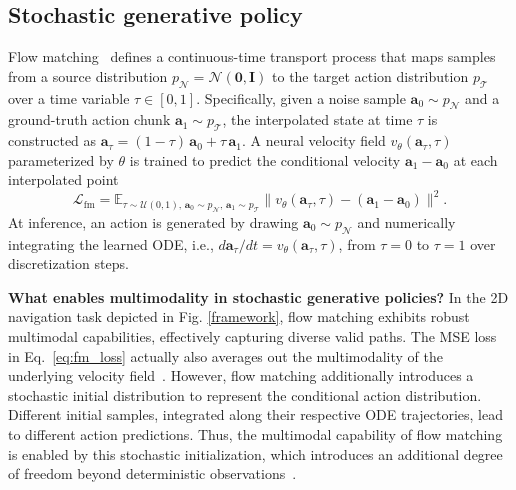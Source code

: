 \subsection{Stochastic generative policy}

Flow matching~\citep{flowmatching} defines a continuous-time transport process that maps samples from a source distribution $p_\mathcal{N} = \mathcal{N}(\mathbf{0}, \mathbf{I})$ to the target action distribution $p_\mathcal{T}$ over a time variable $\tau \in [0,1]$. Specifically, given a noise sample $\mathbf{a}_0 \sim p_\mathcal{N}$ and a ground-truth action chunk $\mathbf{a}_1 \sim p_\mathcal{T}$, the interpolated state at time $\tau$ is constructed as $\mathbf{a}_\tau = (1\!-\!\tau)\,\mathbf{a}_0 + \tau\,\mathbf{a}_1$. A neural velocity field $v_\theta(\mathbf{a}_\tau, \tau)$ parameterized by $\theta$ is trained to predict the conditional velocity $\mathbf{a}_1 - \mathbf{a}_0$ at each interpolated point
\begin{equation}
    \mathcal{L}_{\mathrm{fm}} = \mathbb{E}_{\tau \sim \mathcal{U}(0,1),\,\mathbf{a}_0 \sim p_\mathcal{N} ,\,\mathbf{a}_1\sim p_\mathcal{T}}\|v_\theta(\mathbf{a}_\tau, \tau) - (\mathbf{a}_1 - \mathbf{a}_0)\|^2.
    \label{eq:fm_loss}
\end{equation}
At inference, an action is generated by drawing $\mathbf{a}_0 \sim p_\mathcal{N}$ and numerically integrating the learned ODE, i.e., ${d\mathbf{a}_\tau}/{dt} = v_\theta(\mathbf{a}_\tau, \tau)$, from $\tau\!=\!0$ to $\tau\!=\!1$ over discretization steps.

\textbf{What enables multimodality in stochastic generative policies?} In the 2D navigation task depicted in Fig. \ref{framework}, flow matching exhibits robust multimodal capabilities, effectively capturing diverse valid paths. The MSE loss in Eq.~\eqref{eq:fm_loss} actually also averages out the multimodality of the underlying velocity field~\citep{guo2025variational, zhang2025hierarchical}. However, flow matching additionally introduces a stochastic initial distribution to represent the conditional action distribution. Different initial samples, integrated along their respective ODE trajectories, lead to different action predictions. Thus, the multimodal capability of flow matching is enabled by this stochastic initialization, which introduces an additional degree of freedom beyond deterministic observations~\citep{pearce2023imitating}. 

